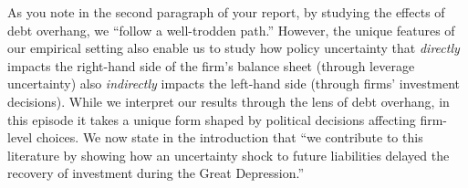 As you note in the second paragraph of your report, by studying the effects of debt overhang, we ``follow a well-trodden path.'' However, the unique features of our empirical setting also enable us to study how policy uncertainty that \textit{directly} impacts the right-hand side of the firm's balance sheet (through leverage uncertainty) also \textit{indirectly} impacts the left-hand side (through firms' investment decisions). While we interpret our results through the lens of debt overhang, in this episode it takes a unique form shaped by political decisions affecting firm-level choices. We now state in the introduction that ``we contribute to this literature by showing how an uncertainty shock to future liabilities delayed the recovery of investment during the Great Depression.''

